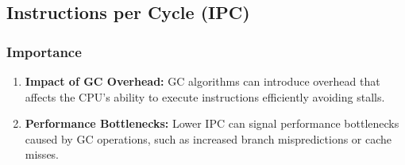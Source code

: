 \documentclass[10pt]{article}
\begin{document}
\subsection{Instructions per Cycle (IPC)}
\subsubsection{Importance}
\begin{enumerate}
  \item \textbf{Impact of GC Overhead:} GC algorithms can introduce overhead that affects the CPU's ability to execute instructions efficiently avoiding stalls.
  \item \textbf{Performance Bottlenecks:} Lower IPC can signal performance bottlenecks caused by GC operations, such as increased branch mispredictions or cache misses.
\end{enumerate}
\end{document}
